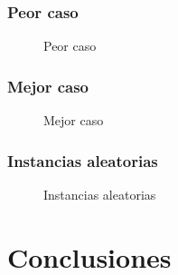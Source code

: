 \documentclass[a4paper, 10pt, twoside]{article}
\newcommand{\tresgraficos}[3]{
    \newcommand{\separacion}{-2.2em}
    \vspace{\separacion}
    
    \vspace{\separacion}
    
    \vspace{\separacion}
    
}
\begin{document}
\newpage


\subsubsection{Peor caso}

\begin{figure}[H]
  \centering
  \tresgraficos{problema3-peor-caso}
               {problema3-peor-caso-logn}
               {problema3-peor-caso-n}
  \caption{Peor caso}
\end{figure}


\subsubsection{Mejor caso}

\begin{figure}[H]
  \centering
  \tresgraficos{problema3-mejor-caso}
               {problema3-mejor-caso-logn}
               {problema3-mejor-caso-n}
  \caption{Mejor caso}
\end{figure}


\subsubsection{Instancias aleatorias}

\begin{figure}[H]
  \centering
  \tresgraficos{problema3-instancias-aleatorias}
               {problema3-instancias-aleatorias-logn}
               {problema3-instancias-aleatorias-n}
  \caption{Instancias aleatorias}
\end{figure}




\newpage

\section{Conclusiones}






\newpage
\end{document}
